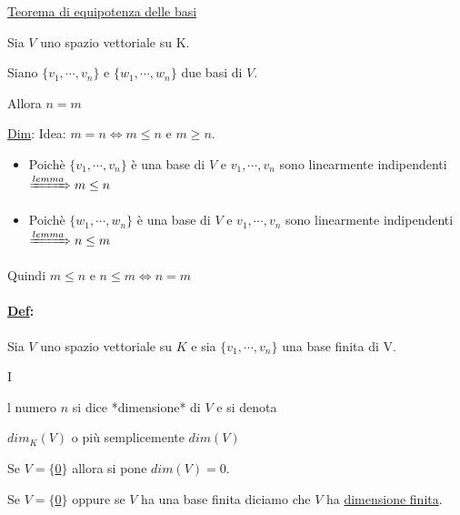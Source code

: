 \documentclass{article}
\newcommand{\ul}[1]{\underline{#1}}
\newcommand{\Def}[2]{\paragraph{\ul{Def}:}#1\\\hspace*{3em}\begin{minipage}{.8\textwidth}#2\end{minipage}}
\begin{document}
	\ul{Teorema di equipotenza delle basi}

	Sia $V$ uno spazio vettoriale su K.

	Siano $\{v_1,\cdots,v_n\}$ e $\{w_1,\cdots,w_n\}$ due basi di $V$.

	Allora $n=m$

	\ul{Dim}: Idea: $m=n\Leftrightarrow m\le n$ e $m\ge n$.
	\begin{itemize}
		\item Poichè $\{v_1,\cdots,v_n\}$ è una base di $V$ e $v_1,\cdots,v_n$ sono linearmente indipendenti $\xRightarrow{lemma}m\le n$
		\item Poichè $\{w_1,\cdots,w_n\}$ è una base di $V$ e $v_1,\cdots,v_n$ sono linearmente indipendenti $\xRightarrow{lemma}n\le m$
	\end{itemize}

	Quindi $m\le n$ e $n\le m\Leftrightarrow n=m$

	\Def{Sia $V$ uno spazio vettoriale su $K$ e sia $\{v_1,\cdots,v_n\}$ una base finita di V.}

	Il numero $n$ si dice *dimensione* di $V$ e si denota

$dim_K(V)$ o più semplicemente $dim(V)$

	Se $V=\{$\ul{0}$\}$ allora si pone $dim(V)=0$.

	Se $V=\{$\ul{0}$\}$ oppure se $V$ ha una base finita diciamo che $V$ ha \ul{dimensione finita}.
\end{document}
